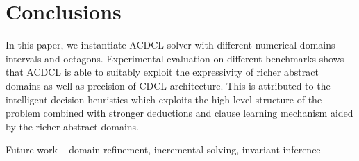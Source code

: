\section{Conclusions}
In this paper, we instantiate ACDCL solver with different numerical domains -- 
intervals and octagons.  Experimental evaluation on different benchmarks shows that
ACDCL is able to suitably exploit the expressivity of richer
abstract domains as well as precision of CDCL architecture.
This is attributed to the intelligent decision heuristics
which exploits the high-level structure of the problem
combined with stronger deductions and clause learning
mechanism aided by the richer abstract domains.

Future work -- domain refinement, incremental solving, invariant inference
